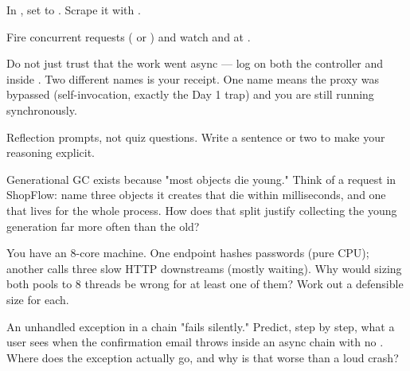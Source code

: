 In , set  to . Scrape it with .

Fire concurrent requests ( or ) and watch  and  at .

\begin{prodtip}
Do not just trust that the work went async --- log  on both the controller and inside . Two different names is your receipt. One name means the proxy was bypassed (self-invocation, exactly the Day 1 trap) and you are still running synchronously.
\end{prodtip}


Reflection prompts, not quiz questions. Write a sentence or two to make your reasoning explicit.

\begin{thinkbox}
Generational GC exists because "most objects die young." Think of a request in ShopFlow: name three objects it creates that die within milliseconds, and one that lives for the whole process. How does that split justify collecting the young generation far more often than the old?
\end{thinkbox}

\begin{thinkbox}
You have an 8-core machine. One endpoint hashes passwords (pure CPU); another calls three slow HTTP downstreams (mostly waiting). Why would sizing both pools to 8 threads be wrong for at least one of them? Work out a defensible size for each.
\end{thinkbox}

\begin{thinkbox}
An unhandled exception in a  chain "fails silently." Predict, step by step, what a user sees when the confirmation email throws inside an async chain with no . Where does the exception actually go, and why is that worse than a loud crash?
\end{thinkbox}

